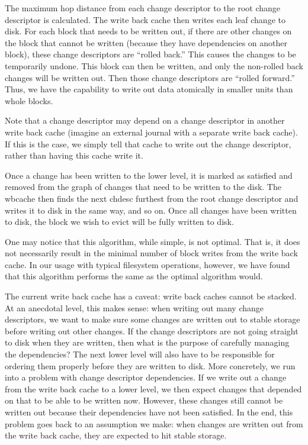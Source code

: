 The maximum hop distance from each change descriptor to the root change
descriptor is calculated. The write back cache then writes each leaf change to
disk. For each block that needs to be written out, if there are other changes on
the block that cannot be written (because they have dependencies on another
block), these change descriptors are ``rolled back.'' This causes the changes to
be temporarily undone. This block can then be written, and only the non-rolled
back changes will be written out. Then those change descriptors are ``rolled
forward.'' Thus, we have the capability to write out data atomically in smaller
units than whole blocks.

Note that a change descriptor may depend on a change descriptor in another write
back cache (imagine an external journal with a separate write back cache). If
this is the case, we simply tell that cache to write out the change descriptor,
rather than having this cache write it.

Once a change has been written to the lower level, it is marked as satisfied and
removed from the graph of changes that need to be written to the disk. The
wbcache then finds the next chdesc furthest from the root change descriptor and
writes it to disk in the same way, and so on. Once all changes have been
written to disk, the block we wish to evict will be fully written to disk.

One may notice that this algorithm, while simple, is not optimal. That is, it
does not necessarily result in the minimal number of block writes from the write
back cache. In our usage with typical filesystem operations, however, we have
found that this algorithm performs the same as the optimal algorithm would.

The current write back cache has a caveat: write back caches cannot be stacked.
At an anecdotal level, this makes sense: when writing out many change
descriptors, we want to make sure some changes are written out to stable storage
before writing out other changes. If the change descriptors are not going
straight to disk when they are written, then what is the purpose of carefully
managing the dependencies? The next lower level will also have to be responsible
for ordering them properly before they are written to disk. More concretely, we
run into a problem with change descriptor dependencies. If we write out a change
from the write back cache to a lower level, we then expect changes that depended
on that to be able to be written now. However, these changes still cannot be
written out because their dependencies have not been satisfied. In the end, this
problem goes back to an assumption we make: when changes are written out from
the write back cache, they are expected to hit stable storage.

